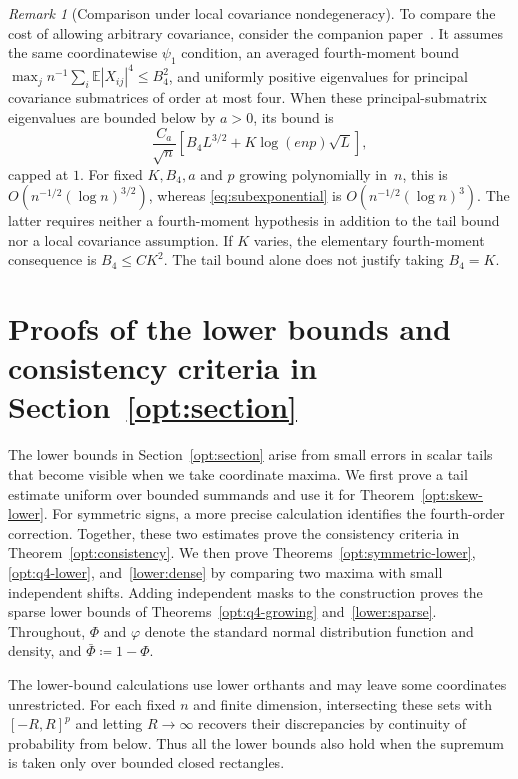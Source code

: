\documentclass[11pt,letterpaper]{article}
\theoremstyle{remark}
\newtheorem{remark}{Remark}
\newcommand{\E}{\mathbb E}
\begin{document}
\begin{remark}[Comparison under local covariance nondegeneracy]\label{tail:rem:local-comparison}
To compare the cost of allowing arbitrary covariance, consider the
companion paper~\cite[Corollary~1]{Local}. It assumes the same
coordinatewise \(\psi_1\) condition, an averaged fourth-moment bound
\(\max_jn^{-1}\sum_i\E|X_{ij}|^4\le B_4^2\), and uniformly positive
eigenvalues for principal covariance submatrices of order at most four.
When these principal-submatrix eigenvalues are bounded below by \(a>0\), its bound is
\[
 \frac{C_a}{\sqrt n}\left[B_4L^{3/2}
                   +K\log(enp)\sqrt L\right],
\]
capped at \(1\). For fixed \(K,B_4,a\) and \(p\) growing polynomially in~\(n\),
this is \(O(n^{-1/2}(\log n)^{3/2})\), whereas
\eqref{eq:subexponential} is \(O(n^{-1/2}(\log n)^3)\).
The latter requires neither a fourth-moment hypothesis in addition to
the tail bound nor a local covariance assumption. If \(K\) varies,
the elementary fourth-moment consequence is \(B_4\le C K^2\).
The tail bound alone does not justify taking \(B_4=K\).
\end{remark}

\section{Proofs of the lower bounds and consistency criteria in Section~\ref*{opt:section}}
\label{app:sharpness-proofs}
The lower bounds in Section~\ref{opt:section} arise from small errors
in scalar tails that become visible when we take coordinate maxima.
We first prove a tail estimate uniform over bounded summands and use
it for Theorem~\ref{opt:skew-lower}. For symmetric signs, a more
precise calculation identifies the fourth-order correction. Together,
these two estimates prove the consistency criteria in
Theorem~\ref{opt:consistency}. We then prove
Theorems~\ref{opt:symmetric-lower}, \ref{opt:q4-lower},
and~\ref{lower:dense} by comparing two maxima with small independent
shifts. Adding independent masks to the construction proves the sparse
lower bounds of Theorems~\ref{opt:q4-growing} and~\ref{lower:sparse}.
Throughout, \(\Phi\) and \(\varphi\) denote the
standard normal distribution function and density, and
\(\bar\Phi\coloneqq1-\Phi\).

The lower-bound calculations use lower orthants and may leave some
coordinates unrestricted. For each fixed \(n\) and finite dimension,
intersecting these sets with \([-R,R]^p\) and letting \(R\to\infty\)
recovers their discrepancies by continuity of probability from below.
Thus all the lower bounds also hold when the supremum is taken only
over bounded closed rectangles.
\end{document}
